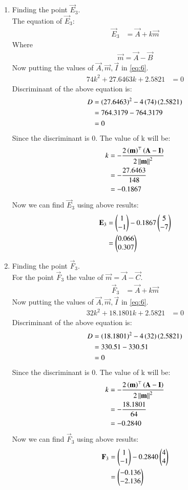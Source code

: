 \documentclass[journal,12pt,twocolumn]{IEEEtran}
\theoremstyle{remark}
\begin{document}
\begin{enumerate}
\item Finding the point $\vec{E}_3$.\\
The equation of $\vec{E}_3$:
\begin{align}
\vec{E}_3 &=\vec{A}+k\vec{m}
\end{align}
Where 
\begin{align}
\vec{m} = \vec{A}-\vec{B}
\end{align}
Now putting the values of $\vec{A}, \vec{m}, \vec{I}$ in \ref{eq:6}.
\begin{align}
74k^2+27.6463k+2.5821 &= 0
\end{align}
Discriminant of the above equation is:
\begin{align}
D &= \left(27.6463\right)^2-4\left(74\right)\left(2.5821\right)\\
&= 764.3179-764.3179\\
&= 0
\end{align}
Since the discriminant is $0$. The value of k will be:
\begin{align}
k &= -\frac{2\left(\mathbf{m}\right)^\top\left(\mathbf{A-I}\right)}{2\left\lVert\mathbf{m}\right\rVert^2} \\
&= -\frac{27.6463}{148} \\
&= -0.1867
\end{align}
Now we can find $\vec{E}_3$ using above results:
\begin{align}
\mathbf{E}_3 &=\begin{pmatrix}1\\-1\end{pmatrix}-0.1867\begin{pmatrix}5\\-7\end{pmatrix} \\
&=\begin{pmatrix}0.066\\0.307\end{pmatrix}
\end{align}
\item Finding the point $\vec{F}_3$.\\
For the point $\vec{F}_3$ the value of $\vec{m} = \vec{A}-\vec{C}$. 
\begin{align}
\vec{F}_3 &=\vec{A}+k\vec{m}
\end{align}
Now putting the values of $\vec{A}, \vec{m}, \vec{I}$ in \ref{eq:6}.
\begin{align}
32k^2+18.1801k+2.5821 &= 0
\end{align}
Discriminant of the above equation is:
\begin{align}
D &= \left(18.1801\right)^2-4\left(32\right)\left(2.5821\right)\\
&= 330.51-330.51\\
&= 0
\end{align}
Since the discriminant is $0$. The value of k will be:
\begin{align}
k &= -\frac{2\left(\mathbf{m}\right)^\top\left(\mathbf{A-I}\right)}{2\left\lVert\mathbf{m}\right\rVert^2}\\
&= -\frac{18.1801}{64}\\
&= -0.2840
\end{align}
Now we can find $\vec{F}_3$ using above results:
\begin{align}
\mathbf{F}_3 &=\begin{pmatrix}1\\-1\end{pmatrix}-0.2840\begin{pmatrix}4\\4\end{pmatrix}\\
&= \begin{pmatrix}-0.136\\-2.136\end{pmatrix}
\end{align}
\end{enumerate}
\end{document}
